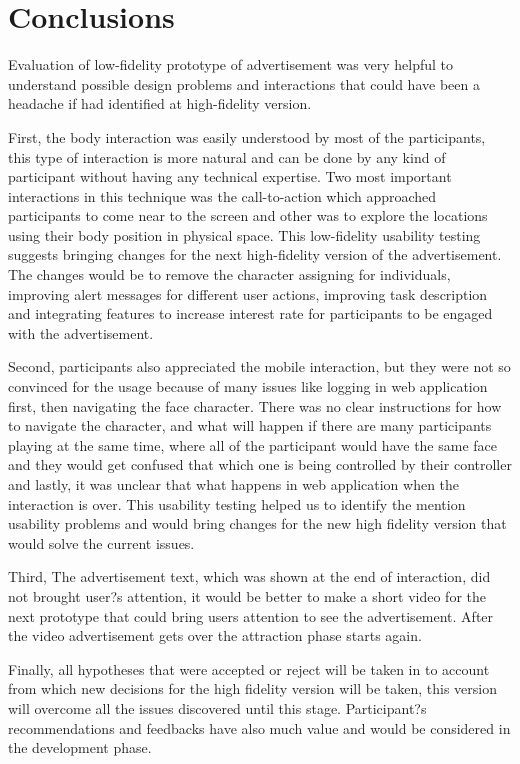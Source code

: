 \newpage
\section{Conclusions}

Evaluation of low-fidelity prototype of advertisement was very helpful to understand possible design problems and interactions that could have been a headache if had identified at high-fidelity version. 

First, the body interaction was easily understood by most of the participants, this type of interaction is more natural and can be done by any kind of participant without having any technical expertise. Two most important interactions in this technique was the call-to-action which approached participants to come near to the screen and other was to explore the locations using their body position in physical space. This low-fidelity usability testing suggests bringing changes for the next high-fidelity version of the advertisement. The changes would be to remove the character assigning for individuals, improving alert messages for different user actions, improving task description and integrating features to increase interest rate for participants to be engaged with the advertisement.

Second, participants also appreciated the mobile interaction, but they were not so convinced for the usage because of many issues like logging in web application first, then navigating the face character. There was no clear instructions for how to navigate the character, and what will happen if there are many participants playing at the same time, where all of the participant would have the same face and they would get confused that which one is being controlled by their controller and lastly, it was unclear that what happens in web application when the interaction is over. This usability testing helped us to identify the mention usability problems and would bring changes for the new high fidelity version that would solve the current issues.

Third, The advertisement text, which was shown at the end of interaction, did not brought user?s attention, it would be better to make a short video for the next prototype that could bring users attention to see the advertisement. After the video advertisement gets over the attraction phase starts again.

Finally, all hypotheses that were accepted or reject will be taken in to account from which new decisions for the high fidelity version will be taken, this version will overcome all the issues discovered until this stage. Participant?s recommendations and feedbacks have also much value and would be considered in the development phase.








